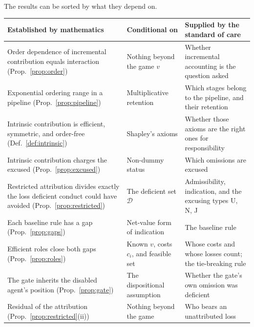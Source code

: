 \documentclass[11pt]{article}
\newcommand{\Dfc}{\mathcal D}
\theoremstyle{plain}
\theoremstyle{definition}
\begin{document}
The results can be sorted by what they depend on.

\begin{center}
\small
\begin{tabular}{@{}p{}p{}p{}@{}}
\hline
Established by mathematics & Conditional on & Supplied by the standard of care\\
\hline
Order dependence of incremental contribution equals interaction (Prop.~\ref{prop:order}) & Nothing beyond the game $v$ & Whether incremental accounting is the question asked\\
Exponential ordering range in a pipeline (Prop.~\ref{prop:pipeline}) & Multiplicative retention & Which stages belong to the pipeline, and their retention\\
Intrinsic contribution is efficient, symmetric, and order-free (Def.~\ref{def:intrinsic}) & Shapley's axioms \cite{shapley1953value} & Whether those axioms are the right ones for responsibility\\
Intrinsic contribution charges the excused (Prop.~\ref{prop:excused}) & Non-dummy status & Which omissions are excused\\
Restricted attribution divides exactly the loss deficient conduct could have avoided (Prop.~\ref{prop:restricted}) & The deficient set $\Dfc$ & Admissibility, indication, and the excusing types U, N, J\\
Each baseline rule has a gap (Prop.~\ref{prop:gaps}) & Net-value form of indication & The baseline rule\\
Efficient roles close both gaps (Prop.~\ref{prop:roles}) & Known $v$, costs $c_i$, and feasible set & Whose costs and whose losses count; the tie-breaking rule\\
The gate inherits the disabled agent's position (Prop.~\ref{prop:gate}) & The dispositional assumption & Whether the gate's own omission was deficient\\
Residual of the attribution (Prop.~\ref{prop:restricted}(ii)) & Nothing beyond the game & Who bears an unattributed loss\\
\hline
\end{tabular}
\end{center}
\end{document}
